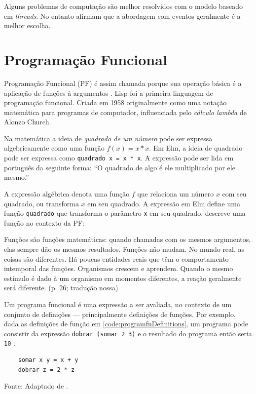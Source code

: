 Alguns problemas de computação são melhor resolvidos com o modelo baseado
em \emph{threads}. No entanto \textcite{blackheath2016} afirmam que a
abordagem com eventos geralmente é a melhor escolha.
\section{Programação Funcional}
\label{sec:org1632044}
Programação Funcional (PF) é assim chamada porque sua operação básica é a
aplicação de funções à argumentos \cite{hughes1990}.
Lisp foi a primeira linguagem de programação funcional.
Criada em 1958 originalmente como uma notação matemática para programas de
computador, influenciada pelo \emph{cálculo lambda} de Alonzo Church.

Na matemática a ideia de \emph{quadrado de um número} pode ser expressa
algebricamente como uma função \(f(x)=x*x\).
Em Elm,  a ideia de quadrado pode ser
expressa como \texttt{quadrado x = x * x}.
A expressão pode ser lida em português da seguinte forma: “O quadrado de algo
é ele multiplicado por ele mesmo.”

A expressão algébrica denota uma função \(f\) que relaciona um número \(x\) com
seu quadrado, ou transforma \(x\) em seu quadrado.
A expressão em Elm define uma função \texttt{quadrado} que transforma o
parâmetro \texttt{x} em seu quadrado.
\textcite{roy2009} descreve uma função no contexto da PF:

\begin{citacao}
  Funções são funções matemáticas: quando chamadas com os mesmos argumentos,
  elas sempre dão os mesmos resultados. Funções não mudam. No mundo real,
  as coisas são diferentes. Há poucas entidades reais que têm o comportamento
  intemporal das funções. Organismos crescem e aprendem. Quando o mesmo
  estímulo é dado à um organismo em momentos diferentes, a reação geralmente
  será diferente. (p. 26; tradução nossa)
\end{citacao}

Um programa funcional é uma expressão a ser avaliada, no contexto de um
conjunto de definições — principalmente definições de funções.
Por exemplo, dada as definições de função em \ref{code:programfnDefinitions}, um
programa pode consistir da expressão \texttt{dobrar (somar 2 3)} e o resultado
do programa então seria \texttt{10} \cite{noble1994}.

\begin{listing}[H]
  \centering
  \caption{Definição das funções \texttt{somar} e \texttt{dobrar}.}
  \begin{verbatim}
    somar x y = x + y
    dobrar z = 2 * z
  \end{verbatim}
  \small Fonte: Adaptado de \textcite{noble1994}.
  \label{code:programfnDefinitions}
\end{listing}

